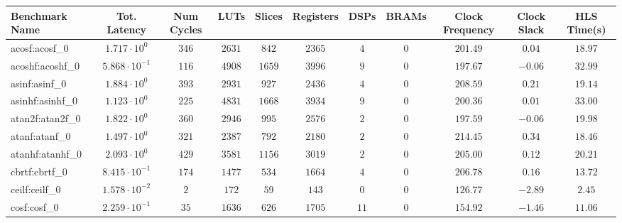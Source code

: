 \begin{tabular}{|l|c|c|c|c|c|c|c|c|c|c|}
\hline
Benchmark Name               & Tot. Latency            & Num Cycles & LUTs      & Slices    & Registers & DSPs    & BRAMs & Clock Frequency & Clock Slack & HLS Time(s) \\
\hline
acosf:acosf\_0               & $ 1.717 \cdot 10^{0}  $ & $ 346    $ & $ 2631  $ & $ 842   $ & $ 2365  $ & $ 4   $ & $ 0 $ & $ 201.49      $ & $ 0.04    $ & $ 18.97   $ \\
acoshf:acoshf\_0             & $ 5.868 \cdot 10^{-1} $ & $ 116    $ & $ 4908  $ & $ 1659  $ & $ 3996  $ & $ 9   $ & $ 0 $ & $ 197.67      $ & $ -0.06   $ & $ 32.99   $ \\
asinf:asinf\_0               & $ 1.884 \cdot 10^{0}  $ & $ 393    $ & $ 2931  $ & $ 927   $ & $ 2436  $ & $ 4   $ & $ 0 $ & $ 208.59      $ & $ 0.21    $ & $ 19.14   $ \\
asinhf:asinhf\_0             & $ 1.123 \cdot 10^{0}  $ & $ 225    $ & $ 4831  $ & $ 1668  $ & $ 3934  $ & $ 9   $ & $ 0 $ & $ 200.36      $ & $ 0.01    $ & $ 33.00   $ \\
atan2f:atan2f\_0             & $ 1.822 \cdot 10^{0}  $ & $ 360    $ & $ 2946  $ & $ 995   $ & $ 2576  $ & $ 2   $ & $ 0 $ & $ 197.59      $ & $ -0.06   $ & $ 19.98   $ \\
atanf:atanf\_0               & $ 1.497 \cdot 10^{0}  $ & $ 321    $ & $ 2387  $ & $ 792   $ & $ 2180  $ & $ 2   $ & $ 0 $ & $ 214.45      $ & $ 0.34    $ & $ 18.46   $ \\
atanhf:atanhf\_0             & $ 2.093 \cdot 10^{0}  $ & $ 429    $ & $ 3581  $ & $ 1156  $ & $ 3019  $ & $ 2   $ & $ 0 $ & $ 205.00      $ & $ 0.12    $ & $ 20.21   $ \\
cbrtf:cbrtf\_0               & $ 8.415 \cdot 10^{-1} $ & $ 174    $ & $ 1477  $ & $ 534   $ & $ 1664  $ & $ 4   $ & $ 0 $ & $ 206.78      $ & $ 0.16    $ & $ 13.72   $ \\
ceilf:ceilf\_0               & $ 1.578 \cdot 10^{-2} $ & $ 2      $ & $ 172   $ & $ 59    $ & $ 143   $ & $ 0   $ & $ 0 $ & $ 126.77      $ & $ -2.89   $ & $ 2.45    $ \\
cosf:cosf\_0                 & $ 2.259 \cdot 10^{-1} $ & $ 35     $ & $ 1636  $ & $ 626   $ & $ 1705  $ & $ 11  $ & $ 0 $ & $ 154.92      $ & $ -1.46   $ & $ 11.06   $ \\

\end{tabular}
